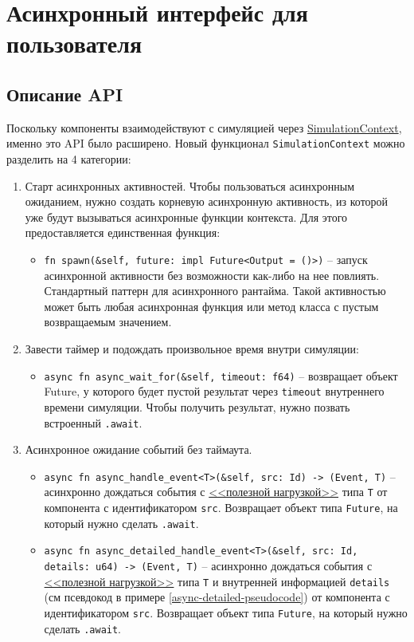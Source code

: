 \section{Асинхронный интерфейс для пользователя} \label{interface}

\subsection{Описание API}

Поскольку компоненты взаимодействуют с симуляцией через \hyperref[SimulationContext]{SimulationContext}, именно это API было расширено. Новый функционал \texttt{SimulationContext} можно разделить на 4 категории: 
\begin{enumerate}
    \item Старт асинхронных активностей. Чтобы пользоваться асинхронным ожиданием, нужно создать корневую асинхронную активность, из которой уже будут вызываться асинхронные функции контекста. Для этого предоставляется единственная функция: 
    \begin{itemize}
        \item \texttt{fn spawn(\&self, future: impl Future<Output = ()>)} -- запуск асинхронной активности без возможности как-либо на нее повлиять. Стандартный паттерн для асинхронного рантайма. Такой активностью может быть любая асинхронная функция или метод класса с пустым возвращаемым значением. \label{spawn}
    \end{itemize}
    \item Завести таймер и подождать произвольное время внутри симуляции: 
    \begin{itemize}
        \item \texttt{async fn async\_wait\_for(\&self, timeout: f64)} -- возвращает объект Future, у которого будет пустой результат через \texttt{timeout} внутреннего времени симуляции. Чтобы получить результат, нужно позвать встроенный \texttt{.await}.
    \end{itemize}
    \item Асинхронное ожидание событий без таймаута. 
    \begin{itemize}
        \item \texttt{async fn async\_handle\_event<T>(\&self, src: Id) -> (Event, T)} -- асинхронно дождаться события с \hyperref[Event:payload]{<<полезной нагрузкой>>} типа \texttt{T} от компонента с идентификатором \texttt{src}. Возвращает объект типа \texttt{Future}, на который нужно сделать \texttt{.await}.
        \item \texttt{async fn async\_detailed\_handle\_event<T>(\&self, src: Id, details: u64) -> (Event, T)} -- асинхронно дождаться события с \hyperref[Event:payload]{<<полезной нагрузкой>>} типа \texttt{T} и внутренней информацией \texttt{details} (см псевдокод в примере \ref{async-detailed-pseudocode}) от компонента с идентификатором \texttt{src}. Возвращает объект типа \texttt{Future}, на который нужно сделать \texttt{.await}.

\end{itemize}
\end{enumerate}
